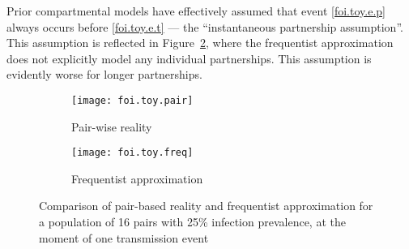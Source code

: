 Prior compartmental models have effectively assumed that
event \ref{foi.toy.e.p} always occurs before \ref{foi.toy.e.t}
--- \ie the ``instantaneous partnership assumption''.
This assumption is reflected in Figure~\ref{fig:foi.toy.freq},
where the frequentist approximation does not explicitly model any individual partnerships.
This assumption is evidently worse for longer partnerships.
\begin{figure}
  \begin{subfigure}{.5\linewidth}
    \centering\texttt{[image: foi.toy.pair]}
    \caption{Pair-wise reality}
    \label{fig:foi.toy.pair}
  \end{subfigure}%
  \begin{subfigure}{.5\linewidth}
    \centering\texttt{[image: foi.toy.freq]}
    \caption{Frequentist approximation}
    \label{fig:foi.toy.freq}
  \end{subfigure}
  \caption{Comparison of pair-based reality and frequentist approximation
    for a population of 16 pairs with 25\% infection prevalence,
    at the moment of one transmission event}
  \label{fig:foi.toy}
\end{figure}
